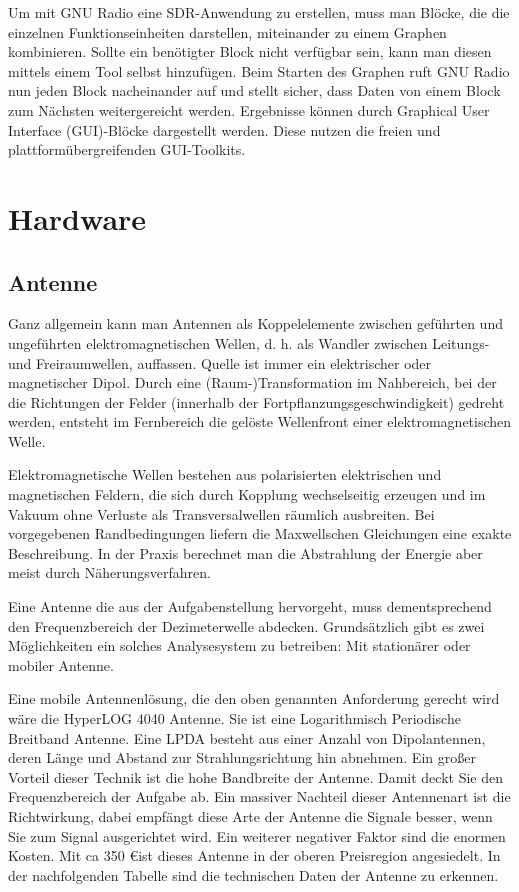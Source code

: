 Um mit GNU Radio eine SDR-Anwendung zu erstellen, muss man Blöcke, die die einzelnen Funktionseinheiten darstellen, miteinander zu einem Graphen kombinieren. Sollte ein benötigter Block nicht verfügbar sein, kann man diesen mittels einem Tool selbst hinzufügen. Beim Starten des Graphen ruft GNU Radio nun jeden Block nacheinander auf und stellt sicher, dass Daten von einem Block zum Nächsten weitergereicht werden. Ergebnisse  können  durch  Graphical  User  Interface  (GUI)-Blöcke dargestellt werden. Diese nutzen die freien und plattformübergreifenden GUI-Toolkits.


\section{Hardware}

\subsection{Antenne} %

Ganz allgemein kann man Antennen als Koppelelemente zwischen geführten und ungeführten elektromagnetischen Wellen, d. h. als Wandler zwischen Leitungs- und Freiraumwellen, auffassen. Quelle ist immer ein elektrischer oder magnetischer Dipol. Durch eine (Raum-)Transformation im Nahbereich, bei der die Richtungen der Felder (innerhalb der Fortpflanzungsgeschwindigkeit) gedreht werden, entsteht im Fernbereich die gelöste Wellenfront einer elektromagnetischen Welle. 

Elektromagnetische Wellen bestehen aus polarisierten elektrischen und magnetischen Feldern, die sich durch Kopplung wechselseitig erzeugen und im Vakuum ohne Verluste als Transversalwellen räumlich ausbreiten. Bei vorgegebenen Randbedingungen liefern die Maxwellschen Gleichungen eine exakte Beschreibung. In der Praxis berechnet man die Abstrahlung der Energie aber meist durch Näherungsverfahren. 

Eine Antenne die aus der Aufgabenstellung hervorgeht, muss dementsprechend den Frequenzbereich der Dezimeterwelle abdecken. Grundsätzlich gibt es zwei Möglichkeiten ein solches Analysesystem zu betreiben: Mit stationärer oder mobiler Antenne.

Eine mobile Antennenlösung, die den oben genannten Anforderung gerecht wird wäre die HyperLOG 4040 Antenne. Sie ist eine Logarithmisch Periodische Breitband Antenne. Eine LPDA besteht aus einer Anzahl von Dipolantennen, deren Länge und Abstand zur Strahlungsrichtung hin abnehmen. Ein großer Vorteil dieser Technik ist die hohe Bandbreite der Antenne. Damit deckt Sie den Frequenzbereich der Aufgabe ab. Ein massiver Nachteil dieser Antennenart ist die Richtwirkung, dabei empfängt diese Arte der Antenne die Signale besser, wenn Sie zum Signal ausgerichtet wird. Ein weiterer negativer Faktor sind die enormen Kosten. Mit ca 350 \euro ist dieses Antenne in der oberen Preisregion angesiedelt. In der nachfolgenden Tabelle sind die technischen Daten der Antenne zu erkennen. 


